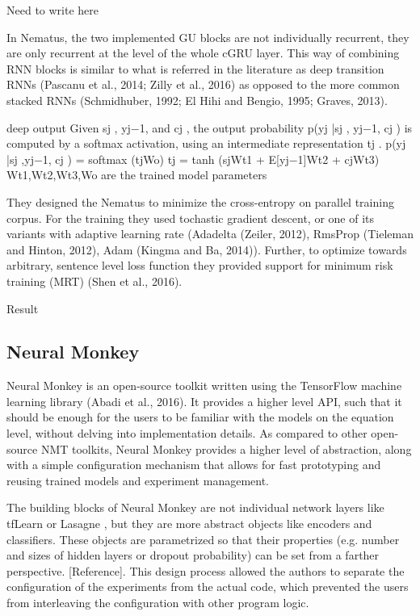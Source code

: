Need to write here

In Nematus, the two implemented GU blocks are not individually recurrent, they are only recurrent at the level of the whole cGRU layer. This way of combining RNN blocks is similar to what is referred in the literature as deep transition RNNs (Pascanu et al., 2014; Zilly et al., 2016) as opposed to the more common stacked RNNs (Schmidhuber, 1992; El Hihi and Bengio, 1995; Graves, 2013).

deep output Given sj , yj−1, and cj , the output probability p(yj |sj , yj−1, cj ) is computed by a softmax activation, using an intermediate representation tj . p(yj |sj ,yj−1, cj ) = softmax (tjWo) tj = tanh (sjWt1 + E[yj−1]Wt2 + cjWt3) Wt1,Wt2,Wt3,Wo are the trained model parameters


They designed the Nematus to minimize the cross-entropy on parallel training corpus. For the training they used tochastic gradient descent, or one of its variants with adaptive learning rate (Adadelta (Zeiler, 2012), RmsProp (Tieleman and Hinton, 2012), Adam (Kingma and Ba, 2014)). Further, to optimize towards arbitrary, sentence level loss function they provided support for minimum risk training (MRT) (Shen et al., 2016). 

Result

\subsection{Neural Monkey}
Neural Monkey is an open-source toolkit written using the TensorFlow machine learning library (Abadi et al., 2016). It provides a higher level API, such that it should be enough for the users to be familiar with the models on the equation level, without delving into implementation details. As compared to other open-source NMT toolkits, Neural Monkey provides a higher level of abstraction, along with a simple configuration mechanism that allows for fast prototyping and reusing trained models and experiment management.

The building blocks of Neural Monkey are not individual network layers like tfLearn or Lasagne , but they are more abstract objects like encoders and classifiers. These objects are parametrized so that their properties (e.g. number and sizes of hidden layers or dropout probability) can be set from a farther perspective. [Reference]. This design process allowed the authors to separate the configuration of the experiments from the actual code, which prevented the users from interleaving the configuration with other program logic. 






